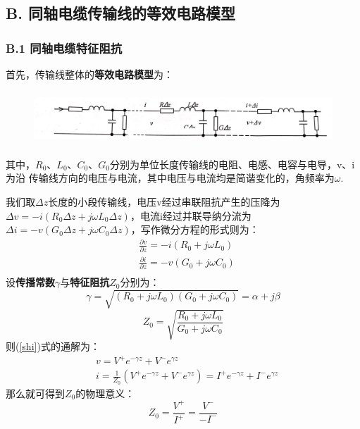 \documentclass[UTF8]{ctexart}
\begin{document}
\subsection*{ B. 同轴电缆传输线的等效电路模型}
\subsubsection*{B.1 同轴电缆特征阻抗}
首先，传输线整体的\textbf{等效电路模型}为：
\begin{figure}[H]
    \centering
    \includegraphics[width=15cm,height=2cm]{5}      
\end{figure}
其中，$R_0$、$L_0$、$C_0$、$G_0$分别为单位长度传输线的电阻、电感、电容与电导，v、i为沿
传输线方向的电压与电流，其中电压与电流均是简谐变化的，角频率为$\omega$.\par
我们取$\Delta z$长度的小段传输线，电压v经过串联阻抗产生的压降为$\Delta v=-i(R_0\Delta z+j\omega L_0\Delta z)$，电流i经过并联导纳分流为$\Delta i=-v(G_0\Delta z+j\omega C_0\Delta z)$，写作微分方程的形式则为：
\begin{equation}
   \begin{aligned}
    &\frac{\partial v}{\partial z}=-i(R_0+j\omega L_0)\\
    &\frac{\partial i}{\partial z}=-v(G_0+j\omega C_0)\\
   \end{aligned}
   \label{shi}
\end{equation}
设\textbf{传播常数$\gamma$}与\textbf{特征阻抗$Z_0$}分别为：
\begin{equation}
   \label{shiyi}
    \gamma=\sqrt{(R_0+j\omega L_0)(G_0+j\omega C_0)}=\alpha+j \beta
\end{equation}
\begin{equation}
    Z_0=\sqrt{\frac{R_0+j\omega L_0}{G_0+j\omega C_0}}
    \label{shier}
\end{equation}
则(\ref{shi})式的通解为：
\begin{equation}
   \begin{aligned}
    &v=V^+e^{-\gamma z}+V^-e^{\gamma z}\\
    &i=\frac{1}{Z_0}(V^+e^{-\gamma z}+V^-e^{\gamma z})=I^+e^{-\gamma z}+I^-e^{\gamma z}
   \end{aligned}
   \label{tongjie}
\end{equation}
那么就可得到$Z_0$的物理意义：
\begin{equation}
    Z_0=\frac{V^+}{I^+}=\frac{V^-}{-I^-}
\end{equation}
\end{document}
